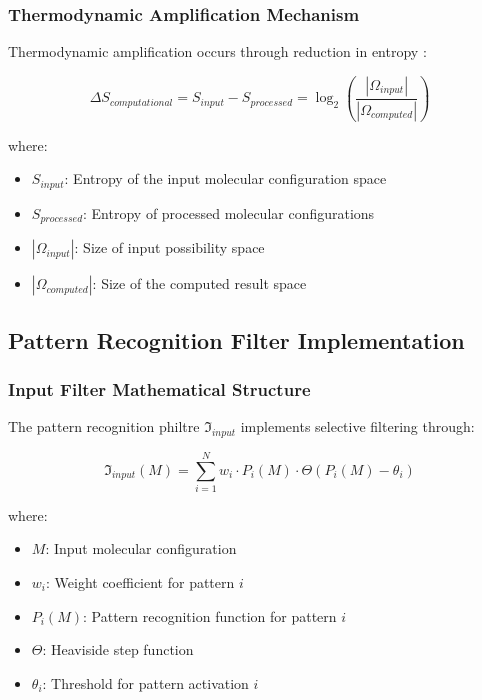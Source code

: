 \documentclass[12pt,a4paper]{article}
\begin{document}
\subsubsection{Thermodynamic Amplification Mechanism}

Thermodynamic amplification occurs through reduction in entropy \cite{jarzynski1997nonequilibrium}:

\begin{equation}
\Delta S_{computational} = S_{input} - S_{processed} = \log_2\left(\frac{|\Omega_{input}|}{|\Omega_{computed}|}\right)
\end{equation}

where:
\begin{itemize}
\item $S_{input}$: Entropy of the input molecular configuration space
\item $S_{processed}$: Entropy of processed molecular configurations
\item $|\Omega_{input}|$: Size of input possibility space
\item $|\Omega_{computed}|$: Size of the computed result space
\end{itemize}

\subsection{Pattern Recognition Filter Implementation}

\subsubsection{Input Filter Mathematical Structure}

The pattern recognition philtre $\mathfrak{I}_{input}$ implements selective filtering through:

\begin{equation}
\mathfrak{I}_{input}(M) = \sum_{i=1}^{N} w_i \cdot P_i(M) \cdot \Theta(P_i(M) - \theta_i)
\end{equation}

where:
\begin{itemize}
\item $M$: Input molecular configuration
\item $w_i$: Weight coefficient for pattern $i$
\item $P_i(M)$: Pattern recognition function for pattern $i$
\item $\Theta$: Heaviside step function
\item $\theta_i$: Threshold for pattern activation $i$
\end{itemize}
\end{document}
